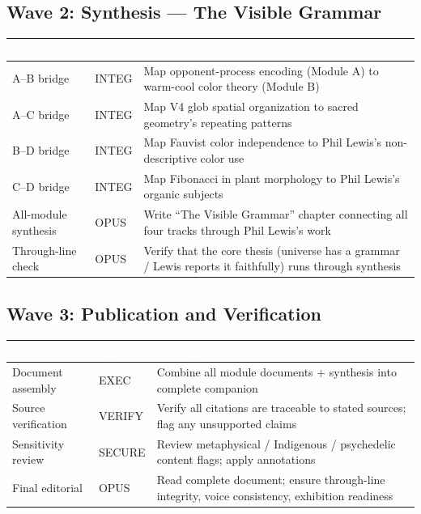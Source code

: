 \documentclass[11pt,letterpaper]{article}
\newcommand{\tableheader}[1]{\textbf{\sffamily\textcolor{white}{#1}}}
\begin{document}
\subsection{Wave 2: Synthesis --- The Visible Grammar}

\begin{center}
\begin{tabularx}{\textwidth}{L{3cm}L{1.5cm}X}
\toprule
{}
\tableheader{Task} & \tableheader{Agent} & \tableheader{Description} \\
\midrule
A--B bridge & INTEG & Map opponent-process encoding (Module A) to warm-cool color theory (Module B) \\
A--C bridge & INTEG & Map V4 glob spatial organization to sacred geometry's repeating patterns \\
B--D bridge & INTEG & Map Fauvist color independence to Phil Lewis's non-descriptive color use \\
C--D bridge & INTEG & Map Fibonacci in plant morphology to Phil Lewis's organic subjects \\
All-module synthesis & OPUS & Write ``The Visible Grammar'' chapter connecting all four tracks through Phil Lewis's work \\
Through-line check & OPUS & Verify that the core thesis (universe has a grammar / Lewis reports it faithfully) runs through synthesis \\
\bottomrule
\end{tabularx}
\end{center}

\subsection{Wave 3: Publication and Verification}

\begin{center}
\begin{tabularx}{\textwidth}{L{3cm}L{1.5cm}X}
\toprule
{}
\tableheader{Task} & \tableheader{Agent} & \tableheader{Description} \\
\midrule
Document assembly & EXEC & Combine all module documents + synthesis into complete companion \\
Source verification & VERIFY & Verify all citations are traceable to stated sources; flag any unsupported claims \\
Sensitivity review & SECURE & Review metaphysical / Indigenous / psychedelic content flags; apply annotations \\
Final editorial & OPUS & Read complete document; ensure through-line integrity, voice consistency, exhibition readiness \\
\bottomrule
\end{tabularx}
\end{center}
\end{document}
